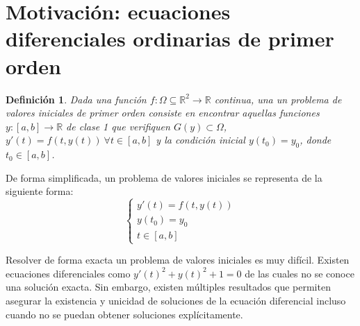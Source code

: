 \documentclass{article}
\theoremstyle{theorem-style}  %
\theoremstyle{definition-style}
\newtheorem{definition}{Definición}[section]
\theoremstyle{example-style}
\begin{document}
\makeatletter\renewcommand{\ALG@name}{Algoritmo}

\maketitle



\newpage
\tableofcontents
\newpage


\section{Motivación: ecuaciones diferenciales ordinarias de primer orden} \label{sec:motivacion}

	\begin{definition} 
		Dada una función $f:\Omega \subseteq \mathbb R^2  \to \mathbb{R}$ continua, una un problema de valores iniciales de primer orden consiste en encontrar aquellas funciones $y: [a,b] \rightarrow \mathbb{R}$ de clase 1 que verifiquen $G(y) \subset \Omega$, $y'(t) = f(t,y(t)) \ \forall t \in [a,b]$ y la condición inicial $y(t_0) = y_0$, donde $t_0 \in [a,b]$.  
	\end{definition}

	De forma simplificada, un problema de valores iniciales se representa de la siguiente forma: 
	\begin{equation*}
		\begin{cases}
			y'(t) = f(t,y(t)) \\
			y(t_0) = y_0 \\
			t \in [a,b]
		\end{cases}
	\end{equation*}

	Resolver de forma exacta un problema de valores iniciales es muy difícil. Existen ecuaciones diferenciales como $y'(t)^2 + y(t)^2 + 1 = 0$ de las cuales no se conoce una solución exacta. Sin embargo, existen múltiples resultados que permiten asegurar la existencia y unicidad de soluciones de la ecuación diferencial incluso cuando no se puedan obtener soluciones explícitamente.
\end{document}
